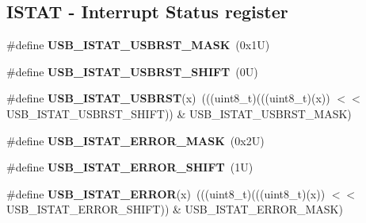 \subsection*{I\+S\+T\+AT -\/ Interrupt Status register}
\begin{DoxyCompactItemize}
\item 
\mbox{\label{group___u_s_b___register___masks_gaacafc35a1c208555b284f9f086708686}} 
\#define {\bfseries U\+S\+B\+\_\+\+I\+S\+T\+A\+T\+\_\+\+U\+S\+B\+R\+S\+T\+\_\+\+M\+A\+SK}~(0x1\+U)
\item 
\mbox{\label{group___u_s_b___register___masks_gad463e743b6bdd9589a499bf654703da0}} 
\#define {\bfseries U\+S\+B\+\_\+\+I\+S\+T\+A\+T\+\_\+\+U\+S\+B\+R\+S\+T\+\_\+\+S\+H\+I\+FT}~(0\+U)
\item 
\mbox{\label{group___u_s_b___register___masks_ga017e21472feb64dd84273dd693e72264}} 
\#define {\bfseries U\+S\+B\+\_\+\+I\+S\+T\+A\+T\+\_\+\+U\+S\+B\+R\+ST}(x)~(((uint8\+\_\+t)(((uint8\+\_\+t)(x)) $<$$<$ U\+S\+B\+\_\+\+I\+S\+T\+A\+T\+\_\+\+U\+S\+B\+R\+S\+T\+\_\+\+S\+H\+I\+FT)) \& U\+S\+B\+\_\+\+I\+S\+T\+A\+T\+\_\+\+U\+S\+B\+R\+S\+T\+\_\+\+M\+A\+SK)
\item 
\mbox{\label{group___u_s_b___register___masks_gaef490eac989ee78a88372bcbf3b029c6}} 
\#define {\bfseries U\+S\+B\+\_\+\+I\+S\+T\+A\+T\+\_\+\+E\+R\+R\+O\+R\+\_\+\+M\+A\+SK}~(0x2\+U)
\item 
\mbox{\label{group___u_s_b___register___masks_gaa4afff6c8a78b6b44f3e314dd4746892}} 
\#define {\bfseries U\+S\+B\+\_\+\+I\+S\+T\+A\+T\+\_\+\+E\+R\+R\+O\+R\+\_\+\+S\+H\+I\+FT}~(1\+U)
\item 
\mbox{\label{group___u_s_b___register___masks_ga0c8f9127484432972e279a49a97902b8}} 
\#define {\bfseries U\+S\+B\+\_\+\+I\+S\+T\+A\+T\+\_\+\+E\+R\+R\+OR}(x)~(((uint8\+\_\+t)(((uint8\+\_\+t)(x)) $<$$<$ U\+S\+B\+\_\+\+I\+S\+T\+A\+T\+\_\+\+E\+R\+R\+O\+R\+\_\+\+S\+H\+I\+FT)) \& U\+S\+B\+\_\+\+I\+S\+T\+A\+T\+\_\+\+E\+R\+R\+O\+R\+\_\+\+M\+A\+SK)
\item 
\mbox{\label{group___u_s_b___register___masks_gab45774502290aab38038a19110e8558b}} 

\end{DoxyCompactItemize}
